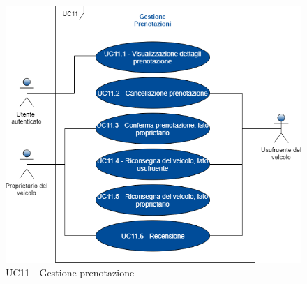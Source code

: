 \begin{figure}[h]
	\includegraphics[width=12cm]{res/images/UC11Prenotazione.png}
	\centering
	\caption{UC11 - Gestione prenotazione}
\end{figure}
